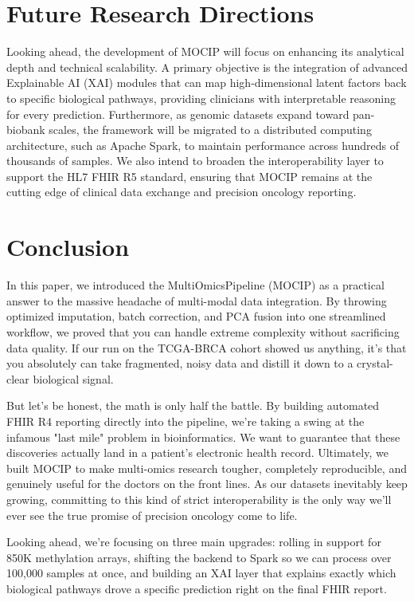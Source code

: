 \documentclass[12pt,a4paper,onecolumn]{article}
\begin{document}

\section{Future Research Directions}
Looking ahead, the development of MOCIP will focus on enhancing its analytical depth and technical scalability. A primary objective is the integration of advanced Explainable AI (XAI) modules that can map high-dimensional latent factors back to specific biological pathways, providing clinicians with interpretable reasoning for every prediction. Furthermore, as genomic datasets expand toward pan-biobank scales, the framework will be migrated to a distributed computing architecture, such as Apache Spark, to maintain performance across hundreds of thousands of samples. We also intend to broaden the interoperability layer to support the HL7 FHIR R5 standard, ensuring that MOCIP remains at the cutting edge of clinical data exchange and precision oncology reporting.
\section{Conclusion}

In this paper, we introduced the MultiOmicsPipeline (MOCIP) as a practical answer to the massive headache of multi-modal data integration. By throwing optimized imputation, batch correction, and PCA fusion into one streamlined workflow, we proved that you can handle extreme complexity without sacrificing data quality. If our run on the TCGA-BRCA cohort showed us anything, it's that you absolutely can take fragmented, noisy data and distill it down to a crystal-clear biological signal.

But let's be honest, the math is only half the battle. By building automated FHIR R4 reporting directly into the pipeline, we're taking a swing at the infamous "last mile" problem in bioinformatics. We want to guarantee that these discoveries actually land in a patient's electronic health record. Ultimately, we built MOCIP to make multi-omics research tougher, completely reproducible, and genuinely useful for the doctors on the front lines. As our datasets inevitably keep growing, committing to this kind of strict interoperability is the only way we'll ever see the true promise of precision oncology come to life.

Looking ahead, we're focusing on three main upgrades: rolling in support for 850K methylation arrays, shifting the backend to Spark so we can process over 100,000 samples at once, and building an XAI layer that explains exactly which biological pathways drove a specific prediction right on the final FHIR report.
\end{document}
